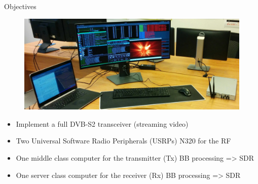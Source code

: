 \begin{frame}{Objectives}
  \vspace{-0.1cm}
  \begin{figure}[htp]
    \centering
    \includegraphics[scale=0.25]{pics/demo_dvbs2}
  \end{figure}
  \begin{itemize}
    \item Implement a full DVB-S2 transceiver (streaming video)
    \item Two Universal Software Radio Peripherals (USRPs) N320 for the RF
    \item One middle class computer for the transmitter (Tx) BB processing => SDR
    \item One server class computer for the receiver (Rx) BB processing => SDR
  \end{itemize}
  \vfill
  \begin{table}[htp]
    \centering
    \caption*{Selected DVB-S2 configurations (MODCOD).}
  \end{table}
  \vfill

\end{frame}

